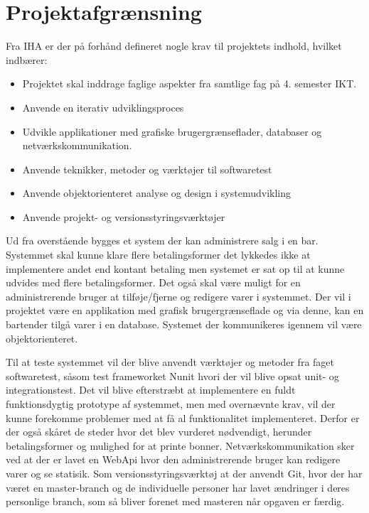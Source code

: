 \chapter{Projektafgrænsning}
Fra IHA  er der på forhånd defineret nogle krav til projektets indhold, hvilket indbærer:
\begin{itemize}
\item Projektet skal inddrage faglige aspekter fra samtlige fag på 4. semester IKT. 
\item Anvende en iterativ udviklingsproces
\item Udvikle applikationer med grafiske brugergrænseflader, databaser og
netværkskommunikation.
\item Anvende teknikker, metoder og værktøjer til softwaretest
\item Anvende objektorienteret analyse og design i systemudvikling
\item Anvende projekt- og versionsstyringsværktøjer
\newline\newline
\end{itemize}

Ud fra overstående bygges et system der kan administrere salg i en bar. 
Systemmet skal kunne klare flere betalingsformer det lykkedes ikke at implementere andet end kontant betaling men systemet er sat op til at kunne udvides med flere betalingsformer. 
Det også skal være muligt for en administrerende bruger at tilføje/fjerne og redigere varer i systemmet.  
\newline\newline
Der vil i projektet være en applikation med grafisk brugergrænseflade og via denne, kan en bartender tilgå varer i en database. Systemet der kommunikeres igennem vil være objektorienteret. 

Til at teste systemmet vil der blive anvendt værktøjer og metoder fra faget softwaretest, såsom test frameworket Nunit hvori der vil blive opsat unit- og integrationstest. 
\newline\newline
Det vil blive efterstræbt at implementere en fuldt funktionsdygtig prototype af systemmet, 
men med overnævnte krav, vil der kunne forekomme problemer med at få al funktionalitet implementeret. 
Derfor er der også skåret de steder hvor det blev vurderet nødvendigt, herunder betalingsformer og mulighed for at printe bonner.
\newline\newline
Netværkskommunikation sker ved at der er lavet en WebApi hvor den administrerende bruger kan redigere varer og se statisik.  
\newline\newline
Som versionsstyringsværktøj at der anvendt Git, hvor der har været en master-branch og de individuelle personer har lavet ændringer i deres personlige branch, som så bliver forenet med masteren når opgaven er færdig.  
